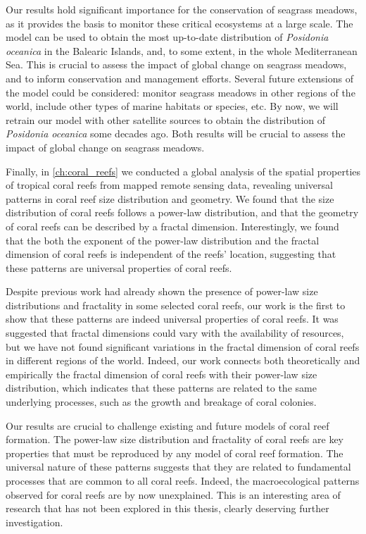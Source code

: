Our results hold significant importance for the conservation of seagrass
meadows, as it provides the basis to monitor these critical ecosystems at a
large scale. The model can be used to obtain the most up-to-date distribution
of \textit{Posidonia oceanica} in the Balearic Islands, and, to some extent, in
the whole Mediterranean Sea. This is crucial to assess the impact of global
change on seagrass meadows, and to inform conservation and management efforts.
Several future extensions of the model could be considered:
monitor seagrass meadows in other regions of the world, include other types of
marine habitats or species, etc. By now, we will retrain our model with other
satellite sources to obtain the distribution of \textit{Posidonia oceanica}
some decades ago. Both results will be crucial to assess the impact of global
change on seagrass meadows.

Finally, in \cref{ch:coral_reefs} we conducted a global analysis of the spatial
properties of tropical coral reefs from mapped remote sensing data, revealing
universal patterns in coral reef size distribution and geometry. We found that
the size distribution of coral reefs follows a power-law distribution, and that
the geometry of coral reefs can be described by a fractal dimension.
Interestingly, we found that the both the exponent of the power-law
distribution and the fractal dimension of coral reefs is independent of the
reefs' location, suggesting that these patterns are universal properties of
coral reefs.

Despite previous work had already shown the presence of power-law size
distributions and fractality in some selected coral reefs, our work is the
first to show that these patterns are indeed universal properties of coral
reefs. It was suggested that fractal dimensions could vary with the
availability of resources, but we have not found significant variations in the
fractal dimension of coral reefs in different regions of the world. Indeed, our
work connects both theoretically and empirically the fractal dimension of coral
reefs with their power-law size distribution, which indicates that these
patterns are related to the same underlying processes, such as the growth and
breakage of coral colonies.

Our results are crucial to challenge existing and future models of coral reef
formation. The power-law size distribution and fractality of coral reefs are
key properties that must be reproduced by any model of coral reef formation.
The universal nature of these patterns suggests that they are related to
fundamental processes that are common to all coral reefs. Indeed, the
macroecological patterns observed for coral reefs are by now unexplained. This
is an interesting area of research that has not been explored in this thesis,
clearly deserving further investigation.